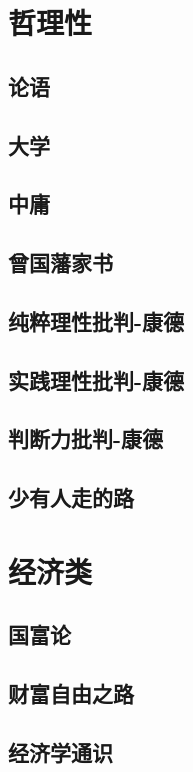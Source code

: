 \documentclass[UTF8,a4paper,12pt]{ctexbook}
\begin{document}
\chapter{哲理性}
	\section{论语}

	\section{大学}
	
	\section{中庸}
	
	\section{曾国藩家书}
	
	\section{纯粹理性批判-康德}
	
	\section{实践理性批判-康德}
	
	\section{判断力批判-康德}
	
	\section{少有人走的路}
\chapter{经济类}
	\section{国富论}
	
	\section{财富自由之路}

	\section{经济学通识}
	
\end{document}
